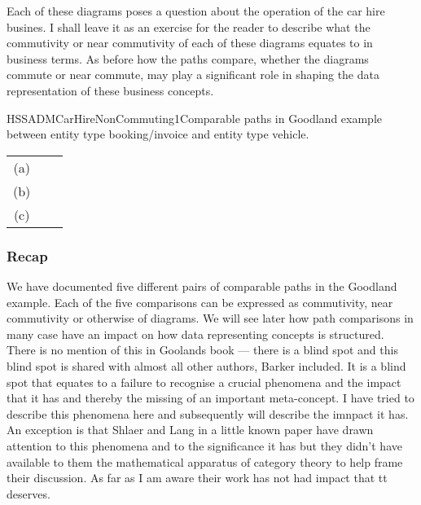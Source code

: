 Each of these diagrams poses a question about the operation of the car hire busines.
I shall leave it as
an exercise for the reader to describe what the commutivity or near commutivity of each of these diagrams equates to in business terms.
As before how the paths compare, whether the diagrams commute or near commute, may play a significant role in  shaping the data representation of these business concepts.

\begin{erboxedFigure}{H}{SSADMCarHireNonCommuting1}{Comparable paths in Goodland example between entity type
booking/invoice and entity type vehicle. }
\begin{tabular}{c p{1cm} c}
(a) &&  \\
(b) &&  \\
(c) && 
\end{tabular}
\end{erboxedFigure}

\subsubsection{Recap}
We have documented five different pairs of comparable paths in the Goodland example. 
Each of the five comparisons can be expressed as commutivity, near commutivity or otherwise of diagrams. We will see later how path comparisons in many case have an impact on how data representing concepts is structured. There is no mention of this in Goolands book --- there is a blind spot and this
blind spot is shared with almost all other authors, Barker included. 
It is a blind spot that equates to a failure to recognise a crucial phenomena and the impact that it has 
and thereby the missing of an important meta-concept. 
I have tried to describe this phenomena here and subsequently will describe the imnpact it has.
An exception is that  Shlaer and Lang in a little known paper have drawn attention to this phenomena
and to the significance it has but they didn't have 
 available to them the mathematical apparatus of category theory to help frame their discussion. 
 As far as I am aware their work has not had impact that tt deserves. 
